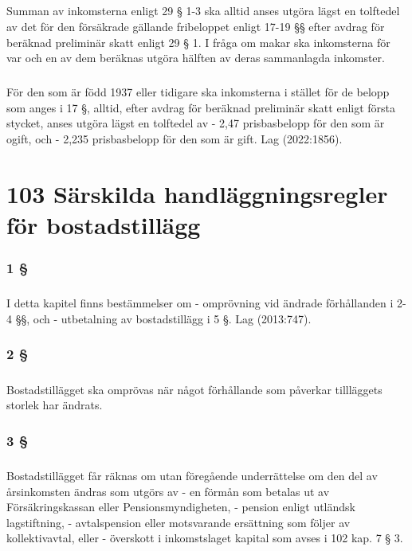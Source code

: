 \documentclass[a4paper,notitlepage,openany,10pt]{book}
\begin{document}
\paragraph*{}
Summan av inkomsterna enligt 29 § 1-3 ska alltid anses utgöra lägst en tolftedel av det för den försäkrade gällande fribeloppet enligt 17-19 §§ efter avdrag för beräknad preliminär skatt enligt 29 § 1. I fråga om makar ska inkomsterna för var och en av dem beräknas utgöra hälften av deras sammanlagda inkomster.
\paragraph*{}
För den som är född 1937 eller tidigare ska inkomsterna i stället för de belopp som anges i 17 §, alltid, efter avdrag för beräknad preliminär skatt enligt första stycket, anses utgöra lägst en tolftedel av
\newline - 2,47 prisbasbelopp för den som är ogift, och
\newline - 2,235 prisbasbelopp för den som är gift.
Lag (2022:1856).
\chapter*{103 Särskilda handläggningsregler för bostadstillägg}
\subsection*{1 §}
\paragraph*{}
I detta kapitel finns bestämmelser om
\newline - omprövning vid ändrade förhållanden i 2-4 §§, och
\newline - utbetalning av bostadstillägg i 5 §.
Lag (2013:747).
\subsection*{2 §}
\paragraph*{}
Bostadstillägget ska omprövas när något förhållande som påverkar tillläggets storlek har ändrats.
\subsection*{3 §}
\paragraph*{}
Bostadstillägget får räknas om utan föregående underrättelse om den del av årsinkomsten ändras som utgörs av
\newline - en förmån som betalas ut av Försäkringskassan eller Pensionsmyndigheten,
\newline - pension enligt utländsk lagstiftning,
\newline - avtalspension eller motsvarande ersättning som följer av kollektivavtal, eller
\newline - överskott i inkomstslaget kapital som avses i 102 kap. 7 § 3.
\end{document}
